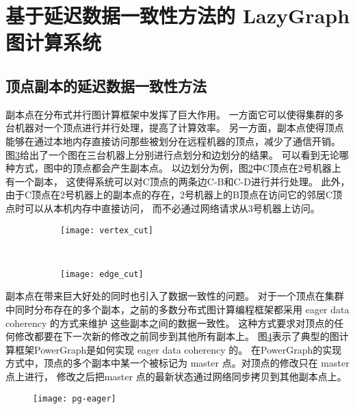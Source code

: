 \section{基于延迟数据一致性方法的 LazyGraph 图计算系统}
\subsection{顶点副本的延迟数据一致性方法}

副本点在分布式并行图计算框架中发挥了巨大作用。
一方面它可以使得集群的多台机器对一个顶点进行并行处理，提高了计算效率。
另一方面，副本点使得顶点能够在通过本地内存直接访问那些被划分在远程机器的顶点，减少了通信开销。
图\ref{fig:graph_cut}给出了一个图在三台机器上分别进行点划分和边划分的结果。
可以看到无论哪种方式，图中的顶点都会产生副本点。
以边划分为例，图\ref{fig:edge_cut}中C顶点在2号机器上有一个副本，
这使得系统可以对C顶点的两条边C-B和C-D进行并行处理。
此外，由于C顶点在2号机器上的副本点的存在，2号机器上的B顶点在访问它的邻居C顶点时可以从本机内存中直接访问，
而不必通过网络请求从3号机器上访问。



\begin{figure}[!htbp]
  \centering
  \begin{subfigure}[b]{0.35\textwidth}
    \texttt{[image: vertex\_cut]}
    \caption{}
    \label{fig:vertex_cut}
  \end{subfigure}%
  ~%
  \begin{subfigure}[b]{0.35\textwidth}
    \texttt{[image: edge\_cut]}
    \caption{}
    \label{fig:edge_cut}
  \end{subfigure}
\label{fig:graph_cut}
\end{figure}


副本点在带来巨大好处的同时也引入了数据一致性的问题。
对于一个顶点在集群中同时分布存在的多个副本，之前的多数分布式图计算编程框架都采用 eager data coherency 的方式来维护
这些副本之间的数据一致性。
这种方式要求对顶点的任何修改都要在下一次新的修改之前同步到其他所有副本上。
图\ref{fig:pg-eager}表示了典型的图计算框架PowerGraph是如何实现 eager data coherency 的。
在PowerGraph的实现方式中，顶点的多个副本中某一个被标记为 master 点。对顶点的修改只在 master 点上进行，
修改之后把master 点的最新状态通过网络同步拷贝到其他副本点上。

\begin{figure}[!htbp]
  \centering
  \texttt{[image: pg-eager]}
  \label{fig:pg-eager}
\end{figure}

